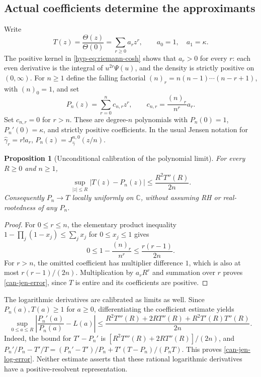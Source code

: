 \documentclass[11pt,a4paper]{article}
\numberwithin{equation}{section}
\newtheorem{proposition}[theorem]{Proposition}
\theoremstyle{definition}
\theoremstyle{remark}
\newcommand{\C}{\mathbb C}
\begin{document}
\subsection{Actual coefficients determine the approximants}

Write
\[
 T(z)=\frac{\Theta(z)}{\Theta(0)}=\sum_{r\geq0}a_rz^r,\qquad
 a_0=1,\quad a_1=\kappa.
\]
The positive kernel in \eqref{hyp-eq:riemann-cosh} shows that $a_r>0$
for every $r$: each even derivative is the integral of
$u^{2r}\Psi(u)$, and the density is strictly positive on $(0,\infty)$.
For $n\geq1$ define the falling factorial
$(n)_r=n(n-1)\cdots(n-r+1)$, with $(n)_0=1$, and set
\begin{equation}\label{can-jen-def}
 P_n(z)=\sum_{r=0}^{n}c_{n,r}z^r,\qquad
 c_{n,r}=\frac{(n)_r}{n^r}a_r.
\end{equation}
Set $c_{n,r}=0$ for $r>n$. These are degree-$n$ polynomials with
$P_n(0)=1$, $P_n'(0)=\kappa$, and strictly positive coefficients.
In the usual Jensen notation for $\widehat\gamma_r=r!a_r$,
$P_n(z)=J_{\widehat\gamma}^{n,0}(z/n)$.

\begin{proposition}[Unconditional calibration of the polynomial limit]
\label{can-jen-convergence}
For every $R\geq0$ and $n\geq1$,
\begin{equation}\label{can-jen-error}
 \sup_{|z|\leq R}|T(z)-P_n(z)|
 \leq \frac{R^2T''(R)}{2n}.
\end{equation}
Consequently $P_n\to T$ locally uniformly on $\C$, without assuming RH
or real-rootedness of any $P_n$.
\end{proposition}
\begin{proof}
For $0\leq r\leq n$, the elementary product inequality
$1-\prod_j(1-x_j)\leq\sum_jx_j$ for $0\leq x_j\leq1$ gives
\[
 0\leq1-\frac{(n)_r}{n^r}
 \leq\frac{r(r-1)}{2n}.
\]
For $r>n$, the omitted coefficient has multiplier difference $1$,
which is also at most $r(r-1)/(2n)$. Multiplication by $a_rR^r$
and summation over $r$ proves \eqref{can-jen-error}, since $T$ is
entire and its coefficients are positive.
\end{proof}

The logarithmic derivatives are calibrated as limits as well. Since
$P_n(a),T(a)\geq1$ for $a\geq0$, differentiating the coefficient
estimate yields
\begin{equation}\label{can-jen-log-error}
 \sup_{0\leq a\leq R}
 \left|\frac{P_n'(a)}{P_n(a)}-L(a)\right|
 \leq
 \frac{R^2T'''(R)+2RT''(R)+R^2T'(R)T''(R)}{2n}.
\end{equation}
Indeed, the bound for $T'-P_n'$ is
$[R^2T'''(R)+2RT''(R)]/(2n)$, and
$P_n'/P_n-T'/T=(P_n'-T')/P_n+
T'(T-P_n)/(P_nT)$. This proves \eqref{can-jen-log-error}.
Neither estimate asserts that these rational logarithmic derivatives
have a positive-resolvent representation.
\end{document}
